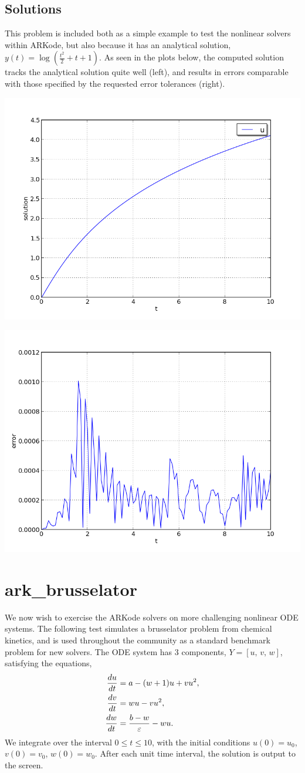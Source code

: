 \documentclass[letterpaper,10pt,english]{sphinxmanual}
\begin{document}
\subsection{Solutions}
\label{c_serial:id4}
This problem is included both as a simple example to test the
nonlinear solvers within ARKode, but also because it has an analytical
solution, \(y(t) = \log\left(\frac{t^2}{2} + t + 1\right)\).  As
seen in the plots below, the computed solution tracks the analytical solution
quite well (left), and results in errors comparable with those
specified by the requested error tolerances (right).

\includegraphics[width=0.450\linewidth]{plot-ark_analytic_nonlin.png}

\includegraphics[width=0.450\linewidth]{plot-ark_analytic_nonlin_error.png}


\section{ark\_brusselator}
\label{c_serial:ark-brusselator}\label{c_serial:id5}
We now wish to exercise the ARKode solvers on more challenging
nonlinear ODE systems.  The following test simulates a brusselator
problem from chemical kinetics, and is used throughout the community
as a standard benchmark problem for new solvers.  The ODE system has
3 components, \(Y = [u,\, v,\, w]\), satisfying the equations,
\begin{gather}
\begin{split}\frac{du}{dt} &= a - (w+1)u + v u^2, \\
\frac{dv}{dt} &= w u - v u^2, \\
\frac{dw}{dt} &= \frac{b-w}{\varepsilon} - w u.\end{split}\notag
\end{gather}
We integrate over the interval \(0 \le t \le 10\), with the
initial conditions \(u(0) = u_0\), \(v(0) = v_0\), \(w(0) = w_0\).
After each unit time interval, the solution is output to the screen.
\end{document}
